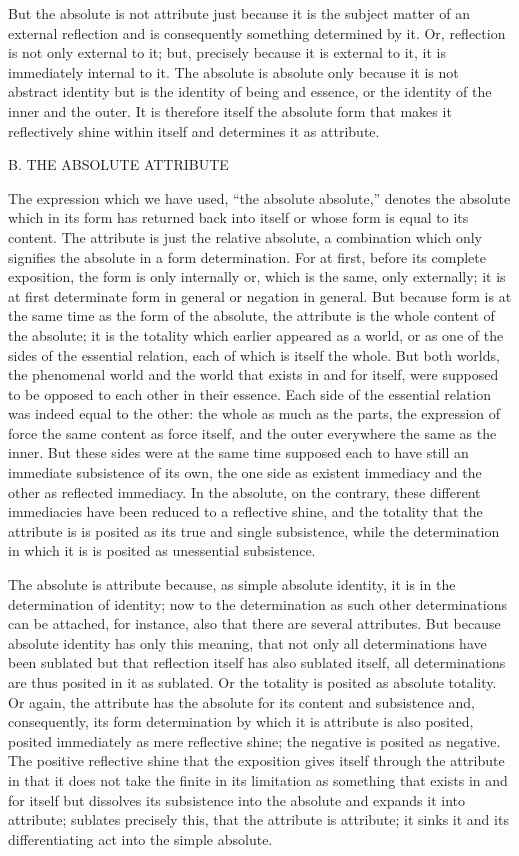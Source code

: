 But the absolute is not attribute just because
it is the subject matter of an external reflection
and is consequently something determined by it.
Or, reflection is not only external to it;
but, precisely because it is external to it,
it is immediately internal to it.
The absolute is absolute only because
it is not abstract identity
but is the identity of being and essence,
or the identity of the inner and the outer.
It is therefore itself the absolute form that makes it
reflectively shine within itself and determines it as attribute.

B. THE ABSOLUTE ATTRIBUTE

The expression which we have used, “the absolute absolute,”
denotes the absolute which in its form has returned back into itself
or whose form is equal to its content.
The attribute is just the relative absolute,
a combination which only signifies the absolute
in a form determination.
For at first, before its complete exposition,
the form is only internally or, which is the same, only externally;
it is at first determinate form in general or negation in general.
But because form is at the same time as the form of the absolute,
the attribute is the whole content of the absolute;
it is the totality which earlier appeared as a world,
or as one of the sides of the essential relation,
each of which is itself the whole.
But both worlds, the phenomenal world
and the world that exists in and for itself,
were supposed to be opposed to each other in their essence.
Each side of the essential relation was indeed equal to the other:
the whole as much as the parts,
the expression of force the same content as force itself,
and the outer everywhere the same as the inner.
But these sides were at the same time supposed each to have still
an immediate subsistence of its own,
the one side as existent immediacy
and the other as reflected immediacy.
In the absolute, on the contrary,
these different immediacies have been
reduced to a reflective shine,
and the totality that the attribute is
is posited as its true and single subsistence,
while the determination in which it is
is posited as unessential subsistence.

The absolute is attribute because,
as simple absolute identity,
it is in the determination of identity;
now to the determination as such other determinations can be attached,
for instance, also that there are several attributes.
But because absolute identity has only this meaning,
that not only all determinations have been sublated
but that reflection itself has also sublated itself,
all determinations are thus posited in it as sublated.
Or the totality is posited as absolute totality.
Or again, the attribute has the absolute for its content
and subsistence and, consequently, its form determination
by which it is attribute is also posited, posited immediately
as mere reflective shine; the negative is posited as negative.
The positive reflective shine that the exposition gives itself
through the attribute in that it does not take the finite
in its limitation as something that exists in and for itself
but dissolves its subsistence into the absolute
and expands it into attribute;
sublates precisely this, that the attribute is attribute;
it sinks it and its differentiating act into the simple absolute.

